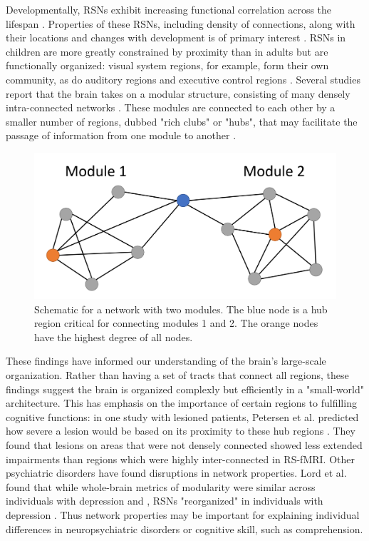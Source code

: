 Developmentally, RSNs exhibit increasing functional correlation across the lifespan \cite{Kesler2013, Uddin2010}. Properties of these RSNs, including density of connections, along with their locations and changes with development is of primary interest  \cite{Cole2014, Dosenbach2007, Fair2009}. RSNs in children are more greatly constrained by proximity than in adults but are functionally organized: visual system regions, for example, form their own community, as do auditory regions and executive control regions \cite{Seeley2007}. Several studies report that the brain takes on a modular structure, consisting of many densely intra-connected networks \cite{Bullmore2009, Fair2009, Supekar2009, Dosenbach2007}. These modules are connected to each other by a smaller number of regions, dubbed "rich clubs" or "hubs", that may facilitate the passage of information from one module to another \cite{Power2013, Bullmore2012}. 

\begin{figure}[t]
    \centering
    \includegraphics[width=14cm]{images/ch1-graph-schema.png}
    \caption[Schematic for a network with two modules.]{Schematic for a network with two modules. The blue node is a hub region critical for connecting modules 1 and 2. The orange nodes have the highest degree of all nodes.}
\end{figure}

These findings have informed our understanding of the brain's large-scale organization. Rather than having a set of tracts that connect all regions, these findings suggest the brain is organized complexly but efficiently in a "small-world" architecture. This has emphasis on the importance of certain regions to fulfilling cognitive functions: in one study with lesioned patients, Petersen et al. predicted how severe a lesion would be based on its proximity to these hub regions \cite{Warren2014}. They found that lesions on areas that were not densely connected showed less extended impairments than regions which were highly inter-connected in RS-fMRI. Other psychiatric disorders have found disruptions in network properties. Lord et al. found that while whole-brain metrics of modularity were similar across individuals with depression and , RSNs "reorganized" in individuals with depression \cite{Lord2012}. Thus network properties may be important for explaining individual differences in neuropsychiatric disorders or cognitive skill, such as comprehension. 

